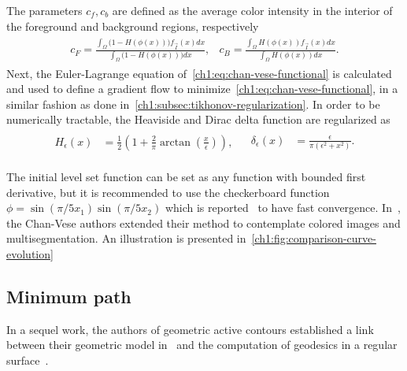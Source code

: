 %
The parameters $c_f,c_b$ are defined as the average color intensity in the interior of the foreground and background regions, respectively
\begin{align*}
\begin{array}{ll}
	\displaystyle c_F = \frac{\int_{\Omega}{\big(1-H(\phi(x))\big)f_{\vec{I}}(x)dx}}{\int_{\Omega}{\big(1-H(\phi(x))\big)dx}}, & 	
	\displaystyle c_B = \frac{\int_{\Omega}{H(\phi(x))f_{\vec{I}}(x)dx}}{\int_{\Omega}{H(\phi(x))dx}}.
\end{array}
\end{align*}
%
Next, the Euler-Lagrange equation of~\cref{ch1:eq:chan-vese-functional} is calculated and used to define a gradient flow to minimize~\cref{ch1:eq:chan-vese-functional}, in a similar fashion as done in~\cref{ch1:subsec:tikhonov-regularization}. In order to be numerically tractable, the Heaviside and Dirac delta function are regularized as 
\begin{align*}
\begin{array}{ll}
	\begin{array}{ll}
		\displaystyle H_{\epsilon}(x) &= \displaystyle \frac{1}{2}\left( 1 + \frac{2}{\pi}\arctan(\frac{x}{\epsilon}) \right),
	\end{array} & 	
	\begin{array}{ll}
		\displaystyle \delta_{\epsilon}(x) &= \displaystyle \frac{\epsilon}{\pi(\epsilon^2 + x^2)}.
	\end{array}	
\end{array}
\end{align*}

The initial level set function can be set as any function with bounded first derivative, but it is recommended to use the checkerboard function $\phi=\sin(\pi/5 x_1)\sin(\pi/5x_2)$ which is reported~\cite{getreuer12} to have fast convergence. In~\cite{vese02}, the Chan-Vese authors extended their method to contemplate colored images and multisegmentation. An illustration is presented in~\cref{ch1:fig:comparison-curve-evolution}




\subsection{Minimum path}

In a sequel work, the authors of geometric active contours established a link between their geometric model in~\cite{caselles93} and the computation of geodesics in a regular surface~\cite{caselles97}. 

